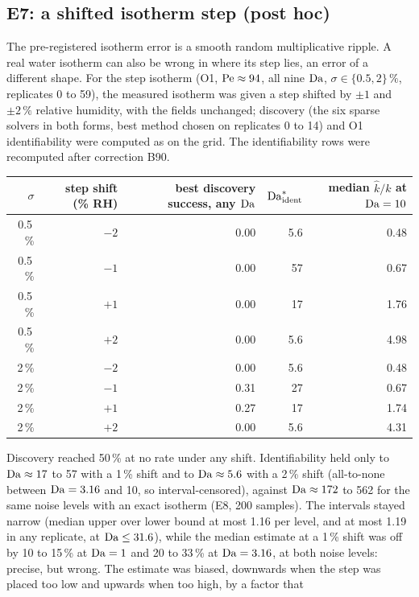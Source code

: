 \subsection*{E7: a shifted isotherm step (post hoc)}
The pre-registered isotherm error is a smooth random multiplicative ripple. A real water isotherm
can also be wrong in where its step lies, an error of a different shape. For the step isotherm (O1, $\mathrm{Pe} \approx 94$, all nine
$\mathrm{Da}$, $\sigma \in \{0.5, 2\}\,\%$, replicates 0 to 59), the measured isotherm was given a step
shifted by $\pm 1$ and $\pm 2\,\%$ relative humidity, with the fields unchanged; discovery (the six
sparse solvers in both forms, best method chosen on replicates 0 to 14) and O1 identifiability
were computed as on the grid. The identifiability rows were recomputed after correction B90.
\begin{center}
\small
\begin{tabular}{@{}rrrrr@{}}
\toprule
$\sigma$ & step shift (\% RH) & best discovery success, any $\mathrm{Da}$ & $\mathrm{Da}^{*}_{\mathrm{ident}}$ & median $\hat{k}/k$ at $\mathrm{Da} = 10$ \\
\midrule
0.5\,\% & $-2$ & 0.00 & 5.6 & 0.48 \\
0.5\,\% & $-1$ & 0.00 & 57 & 0.67 \\
0.5\,\% & $+1$ & 0.00 & 17 & 1.76 \\
0.5\,\% & $+2$ & 0.00 & 5.6 & 4.98 \\
2\,\% & $-2$ & 0.00 & 5.6 & 0.48 \\
2\,\% & $-1$ & 0.31 & 27 & 0.67 \\
2\,\% & $+1$ & 0.27 & 17 & 1.74 \\
2\,\% & $+2$ & 0.00 & 5.6 & 4.31 \\
\bottomrule
\end{tabular}
\end{center}
\noindent Discovery reached 50\,\% at no rate under any shift. Identifiability held only to
$\mathrm{Da} \approx 17$ to 57 with a 1\,\% shift and to $\mathrm{Da} \approx 5.6$ with a 2\,\% shift (all-to-none
between $\mathrm{Da} = 3.16$ and 10, so interval-censored), against $\mathrm{Da} \approx 172$ to 562 for the same
noise levels with an exact isotherm (E8, 200 samples). The intervals stayed narrow (median upper over lower
bound at most 1.16 per level, and at most 1.19 in any replicate, at $\mathrm{Da} \le 31.6$), while the
median estimate at a 1\,\% shift was off by 10 to 15\,\% at $\mathrm{Da} = 1$ and 20 to 33\,\% at
$\mathrm{Da} = 3.16$, at both noise levels: precise, but wrong. The estimate was biased, downwards when the step was placed too low and upwards when too high, by a factor that
